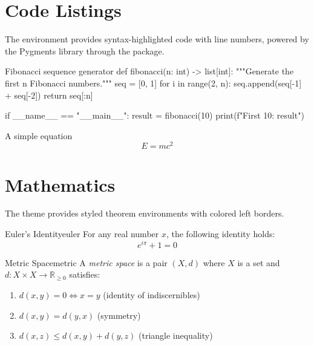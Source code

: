 \documentclass[11pt, a4paper]{scrartcl}
\begin{document}

\section{Code Listings}

The  environment provides syntax-highlighted code with line
numbers, powered by the Pygments library through the  package.

\begin{codeblock}[Python]{Fibonacci sequence generator}
def fibonacci(n: int) -> list[int]:
    """Generate the first n Fibonacci numbers."""
    seq = [0, 1]
    for i in range(2, n):
        seq.append(seq[-1] + seq[-2])
    return seq[:n]

if __name__ == "__main__":
    result = fibonacci(10)
    print(f"First 10: {result}")
\end{codeblock}

\begin{codeblock}[LaTeX]{A simple equation}
\begin{equation}
  E = mc^2
  \label{eq:einstein}
\end{equation}
\end{codeblock}


\section{Mathematics}

The theme provides styled theorem environments with colored left borders.

\begin{theorem}{Euler's Identity}{euler}
  For any real number $x$, the following identity holds:
  \[
    e^{i\pi} + 1 = 0
  \]
\end{theorem}

\begin{definition}{Metric Space}{metric}
  A \emph{metric space} is a pair $(X, d)$ where $X$ is a set and $d: X \times X \to \mathbb{R}_{\geq 0}$ satisfies:
  \begin{enumerate}
    \item $d(x, y) = 0 \iff x = y$ (identity of indiscernibles)
    \item $d(x, y) = d(y, x)$ (symmetry)
    \item $d(x, z) \leq d(x, y) + d(y, z)$ (triangle inequality)
  \end{enumerate}
\end{definition}
\end{document}
